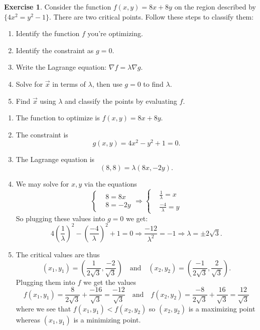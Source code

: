 \documentclass[12pt]{article}
\theoremstyle{plain}
\theoremstyle{definition}
\newtheorem{Ej}[Th]{Exercise}         %
\theoremstyle{remark}
\newcommand{\la}{\lambda}           %
\renewcommand{\:}{\colon}           %
\renewcommand{\.}{\Cdot}                %
\newcommand{\To}{\Rightarrow}
\newcommand{\word}[1]{\quad\text{#1}\quad} %
\begin{document}
    \begin{Ej}
      Consider the function $f(x,y) = 8x + 8y$ on the region described by $\{4x^2 = y^2-1\}$. There are two critical points. Follow these steps to classify them:
      \begin{enumerate}
       \item Identify the function $f$ you're optimizing.
       \item Identify the constraint as $g = 0$.
       \item Write the Lagrange equation: $\nabla f = \lambda \nabla g$.
       \item Solve for $\vec{x}$ in terms of $\lambda$, then use $g = 0$ to find $\lambda$.
       \item Find $\vec{x}$ using $\lambda$ and classify the points by evaluating $f$.
      \end{enumerate}
   \end{Ej}
    \begin{ptcb}
      \begin{enumerate}
        \item The function to optimize is $f(x,y) = 8x+8y$.
        \item The constraint is 
        $$g(x,y)=4x^2 - y^2 +1=0.$$
        \item The Lagrange equation is 
        $$(8,8)=\la(8x,-2y).$$
        \item We may solve for $x,y$ via the equations
        $$
        \left\lbrace\begin{aligned}
          &8=8x\\
          &8=-2y
        \end{aligned}\right.
        \To
        \left\lbrace\begin{aligned}
          &\frac{1}{\la} =x\\
          &\frac{-4}{\la}= y
        \end{aligned}\right.
        $$
        So plugging these values into $g=0$ we get:
        $$4\left(\frac{1}{\la}\right)^2-\left(\frac{-4}{\la}\right)^2+1=0\To\frac{-12}{\la^2}=-1\To\la=\pm 2\sqrt{3}.$$
        \item The critical values are thus 
        $$(x_1,y_1)=\left(\frac{1}{2\sqrt{3}},\frac{-2}{\sqrt{3}}\right)\word{and}(x_2,y_2)=\left(\frac{-1}{2\sqrt{3}},\frac{2}{\sqrt{3}}\right).$$
        Plugging them into $f$ we get the values 
        $$f(x_1,y_1)=\frac{8}{2\sqrt{3}}+\frac{-16}{\sqrt{3}}=\frac{-12}{\sqrt{3}}\word{and}f(x_2,y_2)=\frac{-8}{2\sqrt{3}}+\frac{16}{\sqrt{3}}=\frac{12}{\sqrt{3}}$$
        where we see that $f(x_1,y_1)<f(x_2,y_2)$ so $(x_2,y_2)$ is a maximizing point whereas $(x_1,y_1)$ is a minimizing point.
      \end{enumerate}
    \end{ptcb}
\end{document}
